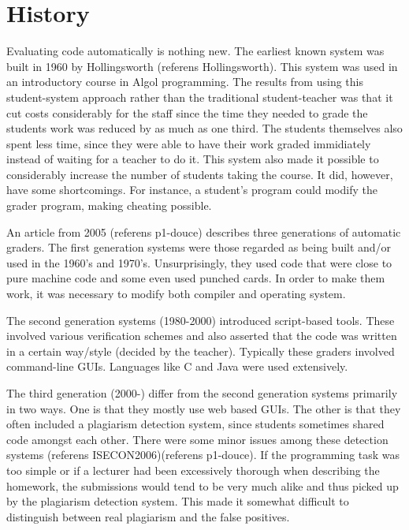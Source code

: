 \section{History}
Evaluating \cite{WinNT} \cite{Nobody06} code automatically is nothing new. The earliest known system was built in 1960 by Hollingsworth (referens Hollingsworth). This system was used in an introductory course in Algol programming. The results from using this student-system approach rather than the traditional student-teacher was that it cut costs considerably for the staff since the time they needed to grade the students work was reduced by as much as one third. The students themselves also spent less time, since they were able to have their work graded immidiately instead of waiting for a teacher to do it. This system also made it possible to considerably increase the number of students taking the course. It did, however, have some shortcomings. For instance, a student's program could modify the grader program, making cheating possible. 

An article from 2005 (referens p1-douce) describes three generations of automatic graders. The first generation systems were those regarded as being built and/or used in the 1960's and 1970's. Unsurprisingly, they used code that were close to pure machine code and some even used punched cards. In order to make them work, it was necessary to modify both compiler and operating system. 

The second generation systems (1980-2000) introduced script-based tools. These involved various verification schemes and also asserted that the code was written in a certain way/style (decided by the teacher). Typically these graders involved command-line GUIs. Languages like C and Java were used extensively.

The third generation (2000-) differ from the second generation systems primarily in two ways. One is that they mostly use web based GUIs. The other is that they often included a plagiarism detection system, since students sometimes shared code amongst each other. There were some minor issues among these detection systems (referens ISECON2006)(referens p1-douce). If the programming task was too simple or if a lecturer had been excessively thorough when describing the homework, the submissions would tend to be very much alike and thus picked up by the plagiarism detection system. This made it somewhat difficult to distinguish between real plagiarism and the false positives. 